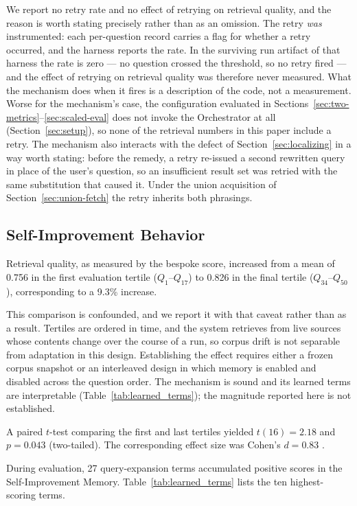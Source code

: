 \documentclass[acmsmall,review,anonymous,screen]{acmart}
\begin{document}
We report no retry rate and no effect of retrying on retrieval quality, and
the reason is worth stating precisely rather than as an omission. The retry
\emph{was} instrumented: each per-question record carries a flag for whether a
retry occurred, and the harness reports the rate. In the surviving run artifact
of that harness the rate is zero --- no question crossed the threshold, so no
retry fired --- and the effect of retrying on retrieval quality was therefore
never measured. What the mechanism does when it fires is a description of the
code, not a measurement. Worse for the mechanism's case, the configuration
evaluated in Sections~\ref{sec:two-metrics}--\ref{sec:scaled-eval} does not
invoke the Orchestrator at all (Section~\ref{sec:setup}), so none of the
retrieval numbers in this paper include a retry. The mechanism also interacts with
the defect of Section~\ref{sec:localizing} in a way worth stating: before the
remedy, a retry re-issued a second rewritten query in place of the user's
question, so an insufficient result set was retried with the same substitution
that caused it. Under the union acquisition of
Section~\ref{sec:union-fetch} the retry inherits both phrasings.

\subsection{Self-Improvement Behavior}

Retrieval quality, as measured by the bespoke score, increased from a mean of
0.756 in the first evaluation tertile ($Q_1$--$Q_{17}$) to 0.826 in the final
tertile ($Q_{34}$--$Q_{50}$), corresponding to a 9.3\% increase.

This comparison is confounded, and we report it with that caveat rather than as
a result. Tertiles are ordered in time, and the system retrieves from live
sources whose contents change over the course of a run, so corpus drift is not
separable from adaptation in this design. Establishing the effect requires
either a frozen corpus snapshot or an interleaved design in which memory is
enabled and disabled across the question order. The mechanism is sound and its
learned terms are interpretable (Table~\ref{tab:learned_terms}); the magnitude
reported here is not established.

A paired $t$-test comparing the first and last tertiles yielded
$t(16)=2.18$ and $p=0.043$ (two-tailed). The corresponding effect size
was Cohen's $d=0.83$ \cite{cohen1988power}.

During evaluation, 27 query-expansion terms accumulated positive scores
in the Self-Improvement Memory. Table~\ref{tab:learned_terms} lists the
ten highest-scoring terms.
\end{document}
